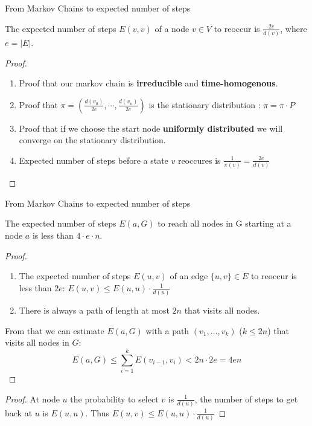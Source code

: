 \begin{frame}{From Markov Chains to expected number of steps}

\begin{theorem}
The expected number of steps $E(v, v)$ of a node $v \in V$ to reoccur is $\frac{2e}{d(v)}$,
where $e = |E|$.
\end{theorem}

\begin{proof}
\begin{enumerate}
\item Proof that our markov chain is \textbf{irreducible} and \textbf{time-homogenous}.
\item Proof that $\pi = (\frac{d(v_0)}{2e}, \cdots, \frac{d(v_n)}{2e})$ is the stationary distribution \cite{aleliunas1979random}: $\pi = \pi \cdot P$
\item Proof that if we choose the start node \textbf{uniformly distributed} we will converge on the stationary distribution.
\item Expected number of steps before a state $v$ reoccures is $\frac{1}{\pi(v)} = \frac{2e}{d(v)}$
\end{enumerate}
\end{proof}

\end{frame}

\begin{frame}{From Markov Chains to expected number of steps}

\begin{theorem}
The expected number of steps $E(a, G)$ to reach all nodes in G starting at a node $a$ is less than $4 \cdot e \cdot n$.
\end{theorem}

\begin{proof}
\begin{enumerate}
\item The expected number of steps $E(u, v)$ of an edge $\{u, v\} \in E$ to reoccur is less than $2e$:
      $E(u, v) \leq E(u, u) \cdot \frac{1}{d(u)}$
\item There is always a path of length at most $2n$ that visits all nodes.
\end{enumerate}
From that we can estimate $E(a, G)$ with a path $(v_1, \dots, v_k)$ ($k \leq 2n$) that visits all nodes in $G$:
$$
E(a, G) \leq \sum_{i=1}^{k} E(v_{i-1}, v_i) < 2n \cdot 2e = 4en
$$
\end{proof}

\begin{proof}
At node $u$ the probability to select $v$ is $\frac{1}{d(u)}$, the number of steps to get back at $u$ is $E(u, u)$.
Thus $E(u, v) \leq E(u, u) \cdot \frac{1}{d(u)}$
\end{proof}

\end{frame}

